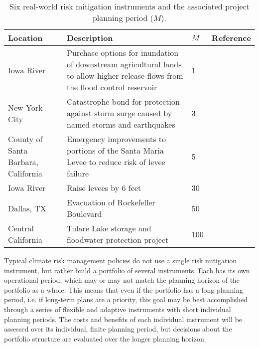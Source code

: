 \documentclass[
  draft,
  linenumbers
]{agujournal2018}
\makeatletter
\newcommand{\ie}{i.e.\@\xspace}
\makeatother
\begin{document}
\noindent\begin{table}
  {\footnotesize
    \begin{tabular}{L{1in}L{2.5in}L{0.3in}L{1.7in}}
      \toprule
      Location & Description & $M$ & Reference \\
      \midrule
      Iowa River & Purchase options for inundation of downstream agricultural lands to allow higher release flows from the flood control reservoir & 1 & \citet{Spence:2016ca} \\
      New York City & Catastrophe bond for protection against storm surge caused by named storms and earthquakes & 3 &  \\
      County of Santa Barbara, California & Emergency improvements to portions of the Santa Maria Levee to reduce risk of levee failure & 5 & \citet{USACE:2007ta} \\
      Iowa River & Raise levees by 6 feet & 30 & \citet{Spence:2016ca} \\
      Dallas, TX & Evacuation of Rockefeller Boulevard & 50 & \citet{USACE:2014vn} \\
      Central California & Tulare Lake storage and floodwater protection project & 100 & \citet{GEI:gIaEZ-gS} \\
      \bottomrule
    \end{tabular}
    \caption{
      Six real-world risk mitigation instruments and the associated project planning period ($M$).
    }\label{tab:real-world-M}
  }
\end{table}

Typical climate risk management policies do not use a single risk mitigation instrument, but rather build a portfolio of several instruments.
Each has its own operational period, which may or may not match the planning horizon of the portfolio as a whole.
This means that even if the portfolio has a long planning period, \ie if long-term plans are a priority, this goal may be best accomplished through a series of flexible and adaptive instruments with short individual planning periods.
The costs and benefits of each individual instrument will be assessed over its individual, finite planning period, but decisions about the portfolio structure are evaluated over the longer planning horizon.
\end{document}
